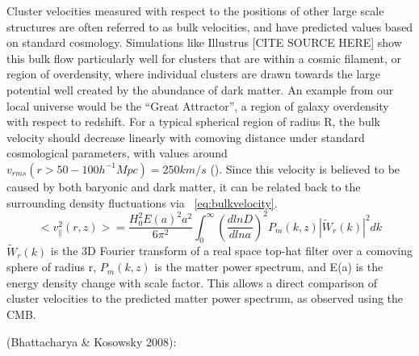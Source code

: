 \documentclass[manuscript]{aastex}
\begin{document}
Cluster velocities measured with respect to the positions of other large scale structures are often referred to as bulk velocities, and have predicted values based on standard cosmology.  Simulations like Illustrus [CITE SOURCE HERE] show this bulk flow particularly well for clusters that are within a cosmic filament, or region of overdensity, where individual clusters are drawn towards the large potential well created by the abundance of dark matter. An example from our local universe would be the ``Great Attractor'', a region of galaxy overdensity with respect to redshift. For a typical spherical region of radius R, the bulk velocity should decrease linearly with comoving distance under standard cosmological parameters, with values around \(v_{rms}(r > 50-100  h^{-1} Mpc) = 250 km/s\) (\cite{Mak2011}). Since this velocity is believed to be caused by both baryonic and dark matter, it can be related back to the surrounding density fluctuations via ~\ref{eq:bulkvelocity}. 
\begin{equation}\label{eq:bulkvelocity}
 <v^{2}_{\parallel}(r,z)> = \frac{H_{0}^{2}E(a)^{2}a^{2}}{6\pi^{2}} \int_{0}^{\infty} (\frac{d ln D}{d ln a})^{2} P_{m}(k,z)|\tilde{W}_{r}(k)|^{2} dk
 \end{equation}
\(\tilde{W}_{r}(k)\) is the 3D Fourier transform of a real space top-hat filter over a comoving sphere of radius r, \(P_{m}(k,z)\) is the matter power spectrum, and E(a) is the energy density change with scale factor. This allows a direct comparison of cluster velocities to the predicted matter power spectrum, as observed using the CMB.

(Bhattacharya \& Kosowsky 2008):


\end{document}
